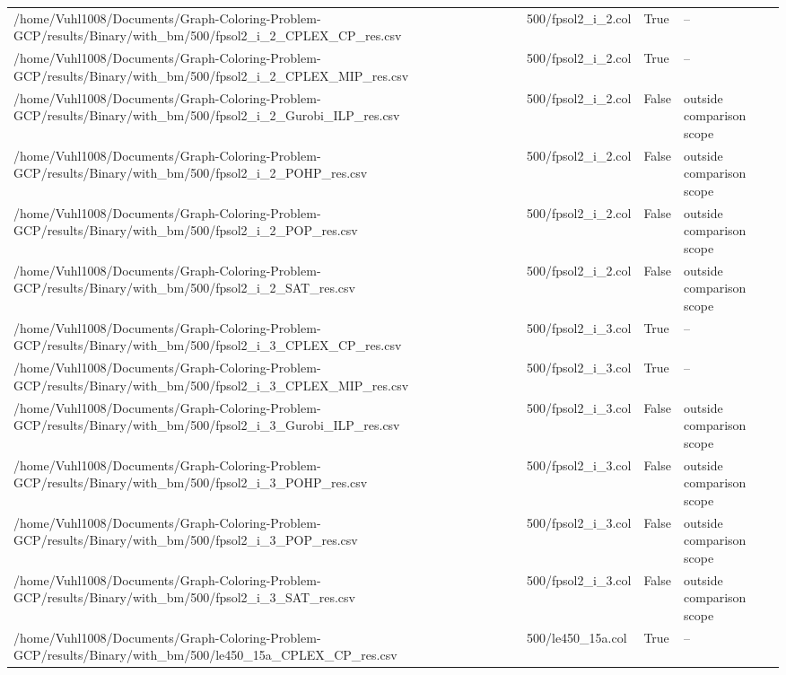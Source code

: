 \begin{table}[htbp]
\begin{tabular}{llll}
/home/Vuhl1008/Documents/Graph-Coloring-Problem-GCP/results/Binary/with\_bm/500/fpsol2\_i\_2\_CPLEX\_CP\_res.csv & 500/fpsol2\_i\_2.col & True & -- \\
/home/Vuhl1008/Documents/Graph-Coloring-Problem-GCP/results/Binary/with\_bm/500/fpsol2\_i\_2\_CPLEX\_MIP\_res.csv & 500/fpsol2\_i\_2.col & True & -- \\
/home/Vuhl1008/Documents/Graph-Coloring-Problem-GCP/results/Binary/with\_bm/500/fpsol2\_i\_2\_Gurobi\_ILP\_res.csv & 500/fpsol2\_i\_2.col & False & outside comparison scope \\
/home/Vuhl1008/Documents/Graph-Coloring-Problem-GCP/results/Binary/with\_bm/500/fpsol2\_i\_2\_POHP\_res.csv & 500/fpsol2\_i\_2.col & False & outside comparison scope \\
/home/Vuhl1008/Documents/Graph-Coloring-Problem-GCP/results/Binary/with\_bm/500/fpsol2\_i\_2\_POP\_res.csv & 500/fpsol2\_i\_2.col & False & outside comparison scope \\
/home/Vuhl1008/Documents/Graph-Coloring-Problem-GCP/results/Binary/with\_bm/500/fpsol2\_i\_2\_SAT\_res.csv & 500/fpsol2\_i\_2.col & False & outside comparison scope \\
/home/Vuhl1008/Documents/Graph-Coloring-Problem-GCP/results/Binary/with\_bm/500/fpsol2\_i\_3\_CPLEX\_CP\_res.csv & 500/fpsol2\_i\_3.col & True & -- \\
/home/Vuhl1008/Documents/Graph-Coloring-Problem-GCP/results/Binary/with\_bm/500/fpsol2\_i\_3\_CPLEX\_MIP\_res.csv & 500/fpsol2\_i\_3.col & True & -- \\
/home/Vuhl1008/Documents/Graph-Coloring-Problem-GCP/results/Binary/with\_bm/500/fpsol2\_i\_3\_Gurobi\_ILP\_res.csv & 500/fpsol2\_i\_3.col & False & outside comparison scope \\
/home/Vuhl1008/Documents/Graph-Coloring-Problem-GCP/results/Binary/with\_bm/500/fpsol2\_i\_3\_POHP\_res.csv & 500/fpsol2\_i\_3.col & False & outside comparison scope \\
/home/Vuhl1008/Documents/Graph-Coloring-Problem-GCP/results/Binary/with\_bm/500/fpsol2\_i\_3\_POP\_res.csv & 500/fpsol2\_i\_3.col & False & outside comparison scope \\
/home/Vuhl1008/Documents/Graph-Coloring-Problem-GCP/results/Binary/with\_bm/500/fpsol2\_i\_3\_SAT\_res.csv & 500/fpsol2\_i\_3.col & False & outside comparison scope \\
/home/Vuhl1008/Documents/Graph-Coloring-Problem-GCP/results/Binary/with\_bm/500/le450\_15a\_CPLEX\_CP\_res.csv & 500/le450\_15a.col & True & -- \\

\end{tabular}
\end{table}
